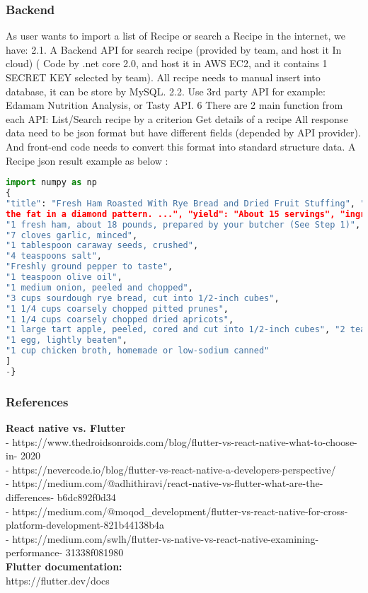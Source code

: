 \documentclass{article}
\begin{document}
\subsubsection{Backend}
As user wants to import a list of Recipe or search a Recipe in the internet, we have: 2.1. A Backend API for search recipe (provided by team, and host it In cloud) ( Code by .net core 2.0, and host it in AWS EC2, and it contains 1 SECRET KEY selected by team). All recipe needs to manual insert into database, it can be store by MySQL. 2.2. Use 3rd party API for example: Edamam Nutrition Analysis, or Tasty API.
6
There are 2 main function from each API: List/Search recipe by a criterion Get details of a recipe
All response data need to be json format but have different fields (depended by API provider). And front-end code needs to convert this format into standard structure data.
A Recipe json result example as below :
\begin{lstlisting}[language=Python, caption=Python example]
import numpy as np
{
"title": "Fresh Ham Roasted With Rye Bread and Dried Fruit Stuffing", "prep": "1. Have your butcher bone and butterfly the ham and score
the fat in a diamond pattern. ...", "yield": "About 15 servings", "ingr": [
"1 fresh ham, about 18 pounds, prepared by your butcher (See Step 1)",
"7 cloves garlic, minced",
"1 tablespoon caraway seeds, crushed",
"4 teaspoons salt",
"Freshly ground pepper to taste",
"1 teaspoon olive oil",
"1 medium onion, peeled and chopped",
"3 cups sourdough rye bread, cut into 1/2-inch cubes",
"1 1/4 cups coarsely chopped pitted prunes",
"1 1/4 cups coarsely chopped dried apricots",
"1 large tart apple, peeled, cored and cut into 1/2-inch cubes", "2 teaspoons chopped fresh rosemary",
"1 egg, lightly beaten",
"1 cup chicken broth, homemade or low-sodium canned"
] 
-}
\end{lstlisting}

\subsubsection{References} 
\textbf{React native vs. Flutter } \\
- https://www.thedroidsonroids.com/blog/flutter-vs-react-native-what-to-choose-in-
2020 \\
- https://nevercode.io/blog/flutter-vs-react-native-a-developers-perspective/ \\
- https://medium.com/@adhithiravi/react-native-vs-flutter-what-are-the-differences-
b6dc892f0d34 \\
- https://medium.com/@moqod_development/flutter-vs-react-native-for-cross- platform-development-821b44138b4a \\
- https://medium.com/swlh/flutter-vs-native-vs-react-native-examining-performance- 31338f081980 \\
\textbf{Flutter documentation: }  \\
https://flutter.dev/docs \\
\end{document}
